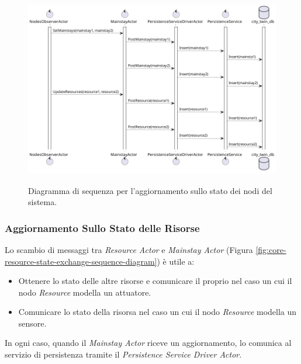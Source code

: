 \documentclass{scrartcl}
\begin{document}
\begin{figure}[H]
    \caption{Diagramma di sequenza per l'aggiornamento sullo stato dei nodi del sistema.}
    \includegraphics[width=\textwidth]{../assets/images/core-nodes-state-sequence-diagram.png}
    \label{fig:core-nodes-state-sequence-diagram}
\end{figure}

\subsubsection{Aggiornamento Sullo Stato delle Risorse}

Lo scambio di messaggi tra \textit{Resource Actor} e \textit{Mainstay Actor} (Figura \ref{fig:core-resource-state-exchange-sequence-diagram}) è utile a:
\begin{itemize}
    \item Ottenere lo stato delle altre risorse e comunicare il proprio nel caso un cui il nodo \textit{Resource} modella un attuatore.
    \item Comunicare lo stato della risorsa nel caso un cui il nodo \textit{Resource} modella un sensore.
\end{itemize}

In ogni caso, quando il \textit{Mainstay Actor} riceve un aggiornamento, lo comunica al servizio di persistenza tramite il \textit{Persistence Service Driver Actor}.
\end{document}
